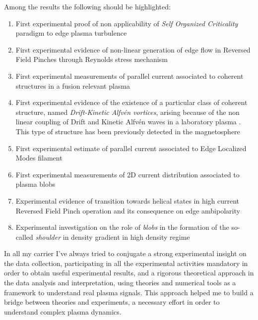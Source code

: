 {Among the results the following should be highlighted:
\begin{enumerate}[itemsep=0.05ex, label=\textbf{\roman*}]
\item First experimental proof of non applicability of \emph{Self
    Organized Criticality} paradigm to edge plasma
  turbulence \parencite{Spada:2001p3574,Antoni:2001p3221}
\item First experimental evidence of non-linear generation of edge
  flow in Reversed Field Pinches through Reynolds stress
  mechanism \parencite{Vianello:2005p1976,Vianello:2005p2671}
\item First experimental measurements of parallel current associated
   to coherent structures in a fusion relevant
   plasma \parencite{Spolaore:2009p4115} 
\item First experimental evidence of the existence of a particular 
  class of coherent structure, named \emph{Drift-Kinetic Alfv\'en
    vortices}, arising because of the non linear coupling of Drift and
  Kinetic Alfv\'en waves in a laboratory plasma \parencite{Vianello:2010p4670}. This type of structure has been
  previously detected in the magnetosphere
\item First experimental estimate of parallel current associated to
   Edge Localized Modes filament \parencite{PhysRevLett.106.125002}
\item First experimental measurements of 2D current distribution
associated to plasma blobs \parencite{Furno:2011cs}
\item Experimental evidence of transition towards helical states in
high current Reversed Field Pinch
operation \parencite{Lorenzini:2009p4248} and its consequence on edge
ambipolarity \parencite{Spizzo:2014jn}
\item Experimental investigation on the role of \emph{blobs} in the
  formation of the so-called \emph{shoulder} in density gradient in
  high density regime \parencite{carralero:prl2015}
\end{enumerate}
In all my carrier I've always tried to conjugate a strong experimental
insight on the data collection, participating in all the experimental
activities mandatory in order to obtain useful experimental results, and a rigorous theoretical approach in
the data analysis and interpretation, using theories and numerical
tools as a framework to understand real plasma signals. This
approach helped me to build a bridge between theories and experiments,
a necessary effort in order to understand complex plasma dynamics.

\printbibliography[type=article,  title = {Cited publications}, heading=subbibliography, prefixnumbers={A}, resetnumbers=true]
}
